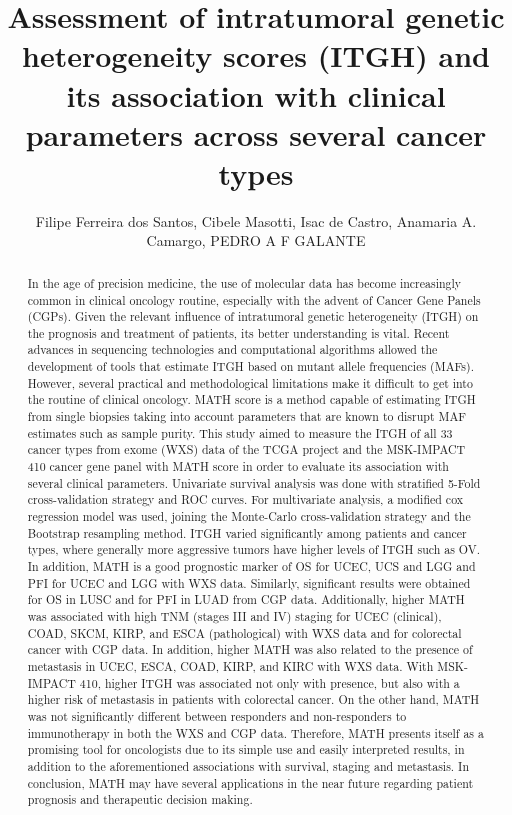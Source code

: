 \documentclass[twoside]{article}
\title{\vspace{-15mm}\fontsize{24pt}{10pt}\selectfont\textbf{ Assessment of intratumoral genetic heterogeneity scores (ITGH) and its association with clinical parameters across several cancer types }} %
\author{ Filipe Ferreira dos Santos, Cibele Masotti, Isac de Castro, Anamaria A. Camargo, PEDRO A F GALANTE }
\affil{ Molecular Oncology Center,  Hospital S\'{\i}rio-Liban\^es,  S\~ao Paulo,  Brazil }
\date{}
\begin{document}
  
  
  \maketitle %
  
  
  \thispagestyle{fancy} %
  
  
  \begin{abstract}
  In the age of precision medicine,  the use of molecular data has become increasingly common in clinical oncology routine,  especially with the advent of Cancer Gene Panels (CGPs). Given the relevant influence of intratumoral genetic heterogeneity (ITGH) on the prognosis and treatment of patients,  its better understanding is vital. Recent advances in sequencing technologies and computational algorithms allowed the development of tools that estimate ITGH based on mutant allele frequencies (MAFs). However,  several practical and methodological limitations make it difficult to get into the routine of clinical oncology. MATH score is a method capable of estimating ITGH from single biopsies taking into account parameters that are known to disrupt MAF estimates such as sample purity. This study aimed to measure the ITGH of all 33 cancer types from exome (WXS) data of the TCGA project and the MSK-IMPACT 410 cancer gene panel with MATH score in order to evaluate its association with several clinical parameters. Univariate survival analysis was done with stratified 5-Fold cross-validation strategy and ROC curves. For multivariate analysis,  a modified cox regression model was used,  joining the Monte-Carlo cross-validation strategy and the Bootstrap resampling method. ITGH varied significantly among patients and cancer types,  where generally more aggressive tumors have higher levels of ITGH such as OV. In addition,  MATH is a good prognostic marker of OS for UCEC,  UCS and LGG and PFI for UCEC and LGG with WXS data. Similarly,  significant results were obtained for OS in LUSC and for PFI in LUAD from CGP data. Additionally,  higher MATH was associated with high TNM (stages III and IV) staging for UCEC (clinical),  COAD,  SKCM,  KIRP,  and ESCA (pathological) with WXS data and for colorectal cancer with CGP data. In addition,  higher MATH was also related to the presence of metastasis in UCEC,  ESCA,  COAD,  KIRP,  and KIRC with WXS data. With MSK-IMPACT 410,  higher ITGH was associated not only with presence,  but also with a higher risk of metastasis in patients with colorectal cancer. On the other hand,  MATH was not significantly different between responders and non-responders to immunotherapy in both the WXS and CGP data. Therefore,  MATH presents itself as a promising tool for oncologists due to its simple use and easily interpreted results,  in addition to the aforementioned associations with survival,  staging and metastasis. In conclusion,  MATH may have several applications in the near future regarding patient prognosis and therapeutic decision making.
  

\end{abstract}
\end{document}
